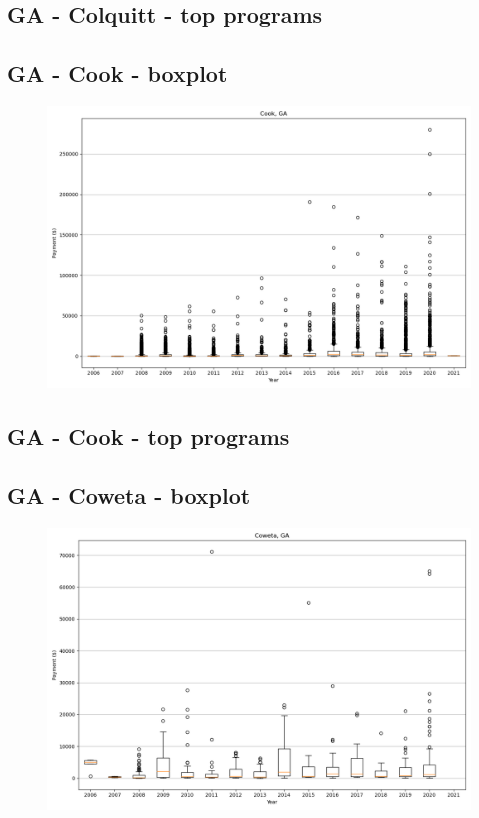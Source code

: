 \subsection*{GA - Colquitt - top programs}

\newpage
\subsection*{GA - Cook - boxplot}
\begin{figure}[h]
\centering
\includegraphics[width=7in]{../output/boxplots/counties/Cook-GA_boxplot.png}
\end{figure}


\subsection*{GA - Cook - top programs}

\newpage
\subsection*{GA - Coweta - boxplot}
\begin{figure}[h]
\centering
\includegraphics[width=7in]{../output/boxplots/counties/Coweta-GA_boxplot.png}
\end{figure}


